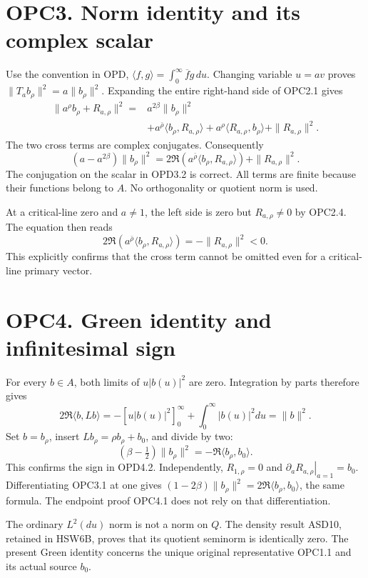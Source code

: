 \section{OPC3. Norm identity and its complex
scalar}\label{opc3.-norm-identity-and-its-complex-scalar}

Use the convention in OPD,
\(\langle f,g\rangle=\int_0^\infty\overline f g\,du\). Changing variable
\(u=av\) proves \(\|T_ab_\rho\|^2=a\|b_\rho\|^2\). Expanding the entire
right-hand side of OPC2.1 gives \[
\begin{aligned}
\|a^\rho b_\rho+R_{a,\rho}\|^2
={}&a^{2\beta}\|b_\rho\|^2\\
&+a^{\bar\rho}\langle b_\rho,R_{a,\rho}\rangle
+a^\rho\langle R_{a,\rho},b_\rho\rangle
+\|R_{a,\rho}\|^2.
\end{aligned}
\] The two cross terms are complex conjugates. Consequently \[
(a-a^{2\beta})\|b_\rho\|^2
=2\Re\!\left(a^{\bar\rho}\langle b_\rho,R_{a,\rho}\rangle\right)
+\|R_{a,\rho}\|^2.
\tag{OPC3.1}
\] The conjugation on the scalar in OPD3.2 is correct. All terms are
finite because their functions belong to \(A\). No orthogonality or
quotient norm is used.

At a critical-line zero and \(a\ne1\), the left side is zero but
\(R_{a,\rho}\ne0\) by OPC2.4. The equation then reads \[
2\Re\!\left(a^{\bar\rho}\langle b_\rho,R_{a,\rho}\rangle\right)
=-\|R_{a,\rho}\|^2<0.
\tag{OPC3.2}
\] This explicitly confirms that the cross term cannot be omitted even
for a critical-line primary vector.

\section{OPC4. Green identity and infinitesimal
sign}\label{opc4.-green-identity-and-infinitesimal-sign}

For every \(b\in A\), both limits of \(u|b(u)|^2\) are zero. Integration
by parts therefore gives \[
2\Re\langle b,Lb\rangle
=-[u|b(u)|^2]_{0}^{\infty}+\int_0^\infty|b(u)|^2du
=\|b\|^2.
\tag{OPC4.1}
\] Set \(b=b_\rho\), insert \(Lb_\rho=\rho b_\rho+b_0\), and divide by
two: \[
\boxed{(\beta-\tfrac12)\|b_\rho\|^2
=-\Re\langle b_\rho,b_0\rangle.}
\tag{OPC4.2}
\] This confirms the sign in OPD4.2. Independently, \(R_{1,\rho}=0\) and
\(\left.\partial_aR_{a,\rho}\right|_{a=1}=b_0\). Differentiating OPC3.1
at one gives \((1-2\beta)\|b_\rho\|^2=2\Re\langle b_\rho,b_0\rangle\),
the same formula. The endpoint proof OPC4.1 does not rely on that
differentiation.

The ordinary \(L^2(du)\) norm is not a norm on \(Q\). The density result
ASD10, retained in HSW6B, proves that its quotient seminorm is
identically zero. The present Green identity concerns the unique
original representative OPC1.1 and its actual source \(b_0\).

